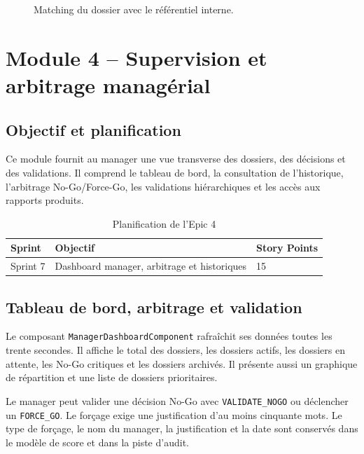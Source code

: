 \begin{figure}[H]
\centering
\caption{Matching du dossier avec le référentiel interne.}
\label{fig:matching}
\end{figure}

\section{Module 4 -- Supervision et arbitrage managérial}

\subsection{Objectif et planification}

Ce module fournit au manager une vue transverse des dossiers, des décisions et des validations. Il comprend le tableau de bord, la consultation de l’historique, l’arbitrage No-Go/Force-Go, les validations hiérarchiques et les accès aux rapports produits.

\begin{table}[H]
\centering
\caption{Planification de l’Epic 4}
\begin{tabular}{lll}
\toprule
\textbf{Sprint} & \textbf{Objectif} & \textbf{Story Points} \\
\midrule
Sprint 7 & Dashboard manager, arbitrage et historiques & 15 \\
\bottomrule
\end{tabular}
\end{table}

\subsection{Tableau de bord, arbitrage et validation}

Le composant \texttt{ManagerDashboardComponent} rafraîchit ses données toutes les trente secondes. Il affiche le total des dossiers, les dossiers actifs, les dossiers en attente, les No-Go critiques et les dossiers archivés. Il présente aussi un graphique de répartition et une liste de dossiers prioritaires.

Le manager peut valider une décision No-Go avec \texttt{VALIDATE\_NOGO} ou déclencher un \texttt{FORCE\_GO}. Le forçage exige une justification d’au moins cinquante mots. Le type de forçage, le nom du manager, la justification et la date sont conservés dans le modèle de score et dans la piste d’audit.

